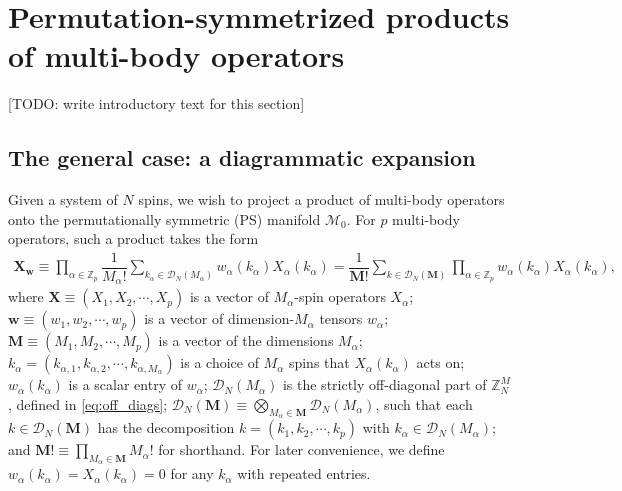 \documentclass[nofootinbib,notitlepage,11pt]{revtex4-2}
\newcommand{\f}[2]{\dfrac{#1}{#2}} %
\newcommand{\p}[1]{\left(#1\right)} %
\newcommand{\m}{\bm} %
\newcommand{\1}{\mathds{1}}
\newcommand{\D}{\mathcal{D}}
\newcommand{\M}{\mathcal{M}}
\newcommand{\ZZ}{\mathbb{Z}}
\newcommand{\red}[1]{{\color{red} #1}}
\begin{document}
\section{Permutation-symmetrized products of multi-body operators}
\label{sec:operator_product}

\red{[TODO: write introductory text for this section]}

\subsection{The general case: a diagrammatic expansion}

Given a system of $N$ spins, we wish to project a product of
multi-body operators onto the permutationally symmetric (PS) manifold
$\M_0$.  For $p$ multi-body operators, such a product takes the form
\begin{align}
  \m X_{\m w}
  \equiv \prod_{\alpha\in\ZZ_p} \f1{M_\alpha!}
  \sum_{k_\alpha\in\D_N\p{M_\alpha}}
  w_\alpha\p{k_\alpha} X_\alpha\p{k_\alpha}
  = \f1{\m M!} \sum_{k\in\D_N\p{\m M}} \prod_{\alpha\in\ZZ_p}
  w_\alpha\p{k_\alpha} X_\alpha\p{k_\alpha},
  \label{eq:sym_prod_start}
\end{align}
where $\m X\equiv\p{X_1,X_2,\cdots,X_p}$ is a vector of
$M_\alpha$-spin operators $X_\alpha$;
$\m w\equiv\p{w_1,w_2,\cdots,w_p}$ is a vector of dimension-$M_\alpha$
tensors $w_\alpha$; $\m M\equiv\p{M_1,M_2,\cdots,M_p}$ is a vector of
the dimensions $M_\alpha$;
$k_\alpha=\p{k_{\alpha,1},k_{\alpha,2},\cdots,k_{\alpha,M_\alpha}}$ is
a choice of $M_\alpha$ spins that $X_\alpha\p{k_\alpha}$ acts on;
$w_\alpha\p{k_\alpha}$ is a scalar entry of $w_\alpha$;
$\D_N\p{M_\alpha}$ is the strictly off-diagonal part of $\ZZ_N^M$,
defined in \eqref{eq:off_diags};
$\D_N\p{\m M}\equiv\bigotimes_{M_\alpha\in\m M}\D_N\p{M_\alpha}$, such
that each $k\in\D_N\p{\m M}$ has the decomposition
$k=\p{k_1,k_2,\cdots,k_p}$ with $k_\alpha\in\D_N\p{M_\alpha}$; and
$\m M!\equiv\prod_{M_\alpha\in\m M}M_\alpha!$ for shorthand.  For
later convenience, we define
$w_\alpha\p{k_\alpha}=X_\alpha\p{k_\alpha}=0$ for any $k_\alpha$ with
repeated entries.
\end{document}

